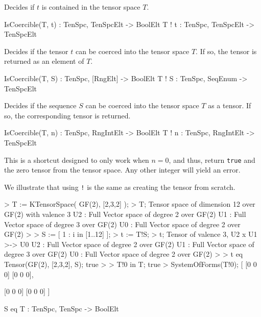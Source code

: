 Decides if $t$ is contained in the tensor space $T$.

\begin{intrinsics}
IsCoercible(T, t) : TenSpc, TenSpcElt -> BoolElt
T ! t : TenSpc, TenSpcElt -> TenSpcElt
\end{intrinsics}

Decides if the tensor $t$ can be coerced into the tensor space $T$. If so, the tensor is returned as an element of $T$.

\begin{intrinsics}
IsCoercible(T, S) : TenSpc, [RngElt] -> BoolElt
T ! S : TenSpc, SeqEnum -> TenSpcElt
\end{intrinsics}

Decides if the sequence $S$ can be coerced into the tensor space $T$ as a tensor. If so, the corresponding tensor is returned. 

\begin{intrinsics}
IsCoercible(T, n) : TenSpc, RngIntElt -> BoolElt
T ! n : TenSpc, RngIntElt -> TenSpcElt
\end{intrinsics}

This is a shortcut designed to only work when $n=0$, and thus, return {\tt true} and the zero tensor from the tensor space. 
Any other integer will yield an error.

\begin{example}[Coercion]
We illustrate that using \texttt{!} is the same as creating the tensor from scratch.

\begin{code}
> T := KTensorSpace( GF(2), [2,3,2] );
> T;
Tensor space of dimension 12 over GF(2) with valence 3
U2 : Full Vector space of degree 2 over GF(2)
U1 : Full Vector space of degree 3 over GF(2)
U0 : Full Vector space of degree 2 over GF(2)
> 
> S := [ 1 : i in [1..12] ];
> t := T!S;
> t;
Tensor of valence 3, U2 x U1 >-> U0
U2 : Full Vector space of degree 2 over GF(2)
U1 : Full Vector space of degree 3 over GF(2)
U0 : Full Vector space of degree 2 over GF(2)
> 
> t eq Tensor(GF(2), [2,3,2], S);
true
> 
> T!0 in T;
true
> SystemOfForms(T!0);
[
    [0 0 0]
    [0 0 0],

    [0 0 0]
    [0 0 0]
]
\end{code}

\end{example}

\begin{intrinsics}
S eq T : TenSpc, TenSpc -> BoolElt
\end{intrinsics}

